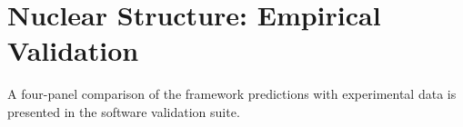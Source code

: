\section{Nuclear Structure: Empirical Validation}
\label{sec:nuclearvalidation}

A four-panel comparison of the framework predictions with experimental data
is presented in the software validation suite.


